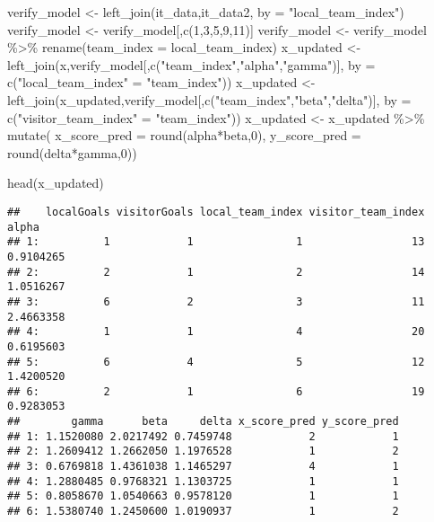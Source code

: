 \documentclass[
]{article}
\newenvironment{Shaded}{\begin{snugshade}}{\end{snugshade}}
\newcommand{\AttributeTok}[1]{\textcolor[rgb]{0.77,0.63,0.00}{#1}}
\newcommand{\DecValTok}[1]{\textcolor[rgb]{0.00,0.00,0.81}{#1}}
\newcommand{\FunctionTok}[1]{\textcolor[rgb]{0.00,0.00,0.00}{#1}}
\newcommand{\NormalTok}[1]{#1}
\newcommand{\OtherTok}[1]{\textcolor[rgb]{0.56,0.35,0.01}{#1}}
\newcommand{\SpecialCharTok}[1]{\textcolor[rgb]{0.00,0.00,0.00}{#1}}
\newcommand{\StringTok}[1]{\textcolor[rgb]{0.31,0.60,0.02}{#1}}
\begin{document}
\begin{Shaded}
\begin{Highlighting}[]
\NormalTok{verify\_model }\OtherTok{\textless{}{-}} \FunctionTok{left\_join}\NormalTok{(it\_data,it\_data2, }\AttributeTok{by =} \StringTok{"local\_team\_index"}\NormalTok{)}
\NormalTok{verify\_model }\OtherTok{\textless{}{-}}\NormalTok{ verify\_model[,}\FunctionTok{c}\NormalTok{(}\DecValTok{1}\NormalTok{,}\DecValTok{3}\NormalTok{,}\DecValTok{5}\NormalTok{,}\DecValTok{9}\NormalTok{,}\DecValTok{11}\NormalTok{)]}
\NormalTok{verify\_model }\OtherTok{\textless{}{-}}\NormalTok{ verify\_model }\SpecialCharTok{\%\textgreater{}\%}
  \FunctionTok{rename}\NormalTok{(}\AttributeTok{team\_index =}\NormalTok{ local\_team\_index)}
\NormalTok{x\_updated }\OtherTok{\textless{}{-}} \FunctionTok{left\_join}\NormalTok{(x,verify\_model[,}\FunctionTok{c}\NormalTok{(}\StringTok{"team\_index"}\NormalTok{,}\StringTok{"alpha"}\NormalTok{,}\StringTok{"gamma"}\NormalTok{)], }\AttributeTok{by =} \FunctionTok{c}\NormalTok{(}\StringTok{"local\_team\_index"} \OtherTok{=} \StringTok{"team\_index"}\NormalTok{))}
\NormalTok{x\_updated }\OtherTok{\textless{}{-}} \FunctionTok{left\_join}\NormalTok{(x\_updated,verify\_model[,}\FunctionTok{c}\NormalTok{(}\StringTok{"team\_index"}\NormalTok{,}\StringTok{"beta"}\NormalTok{,}\StringTok{"delta"}\NormalTok{)], }\AttributeTok{by =} \FunctionTok{c}\NormalTok{(}\StringTok{"visitor\_team\_index"} \OtherTok{=} \StringTok{"team\_index"}\NormalTok{))}
\NormalTok{x\_updated }\OtherTok{\textless{}{-}}\NormalTok{ x\_updated }\SpecialCharTok{\%\textgreater{}\%}
  \FunctionTok{mutate}\NormalTok{( }\AttributeTok{x\_score\_pred =} \FunctionTok{round}\NormalTok{(alpha}\SpecialCharTok{*}\NormalTok{beta,}\DecValTok{0}\NormalTok{),}
          \AttributeTok{y\_score\_pred =} \FunctionTok{round}\NormalTok{(delta}\SpecialCharTok{*}\NormalTok{gamma,}\DecValTok{0}\NormalTok{))}

\FunctionTok{head}\NormalTok{(x\_updated)}
\end{Highlighting}
\end{Shaded}

\begin{verbatim}
##    localGoals visitorGoals local_team_index visitor_team_index     alpha
## 1:          1            1                1                 13 0.9104265
## 2:          2            1                2                 14 1.0516267
## 3:          6            2                3                 11 2.4663358
## 4:          1            1                4                 20 0.6195603
## 5:          6            4                5                 12 1.4200520
## 6:          2            1                6                 19 0.9283053
##        gamma      beta     delta x_score_pred y_score_pred
## 1: 1.1520080 2.0217492 0.7459748            2            1
## 2: 1.2609412 1.2662050 1.1976528            1            2
## 3: 0.6769818 1.4361038 1.1465297            4            1
## 4: 1.2880485 0.9768321 1.1303725            1            1
## 5: 0.8058670 1.0540663 0.9578120            1            1
## 6: 1.5380740 1.2450600 1.0190937            1            2
\end{verbatim}
\end{document}
